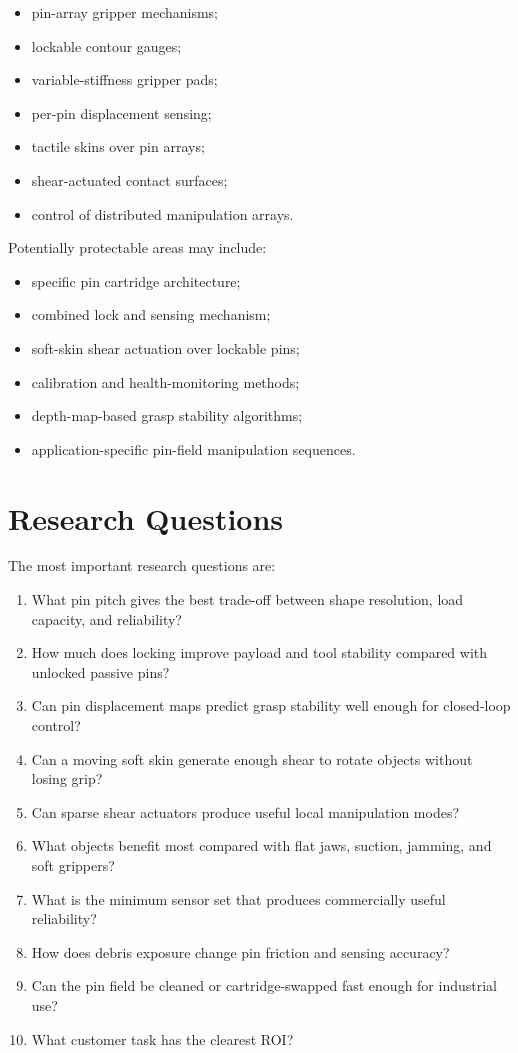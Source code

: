 \documentclass[11pt]{article}
\begin{document}
\begin{itemize}[leftmargin=*]
  \item pin-array gripper mechanisms;
  \item lockable contour gauges;
  \item variable-stiffness gripper pads;
  \item per-pin displacement sensing;
  \item tactile skins over pin arrays;
  \item shear-actuated contact surfaces;
  \item control of distributed manipulation arrays.
\end{itemize}

Potentially protectable areas may include:

\begin{itemize}[leftmargin=*]
  \item specific pin cartridge architecture;
  \item combined lock and sensing mechanism;
  \item soft-skin shear actuation over lockable pins;
  \item calibration and health-monitoring methods;
  \item depth-map-based grasp stability algorithms;
  \item application-specific pin-field manipulation sequences.
\end{itemize}

\section{Research Questions}

The most important research questions are:

\begin{enumerate}[leftmargin=*]
  \item What pin pitch gives the best trade-off between shape resolution, load capacity, and reliability?
  \item How much does locking improve payload and tool stability compared with unlocked passive pins?
  \item Can pin displacement maps predict grasp stability well enough for closed-loop control?
  \item Can a moving soft skin generate enough shear to rotate objects without losing grip?
  \item Can sparse shear actuators produce useful local manipulation modes?
  \item What objects benefit most compared with flat jaws, suction, jamming, and soft grippers?
  \item What is the minimum sensor set that produces commercially useful reliability?
  \item How does debris exposure change pin friction and sensing accuracy?
  \item Can the pin field be cleaned or cartridge-swapped fast enough for industrial use?
  \item What customer task has the clearest ROI?
\end{enumerate}
\end{document}
